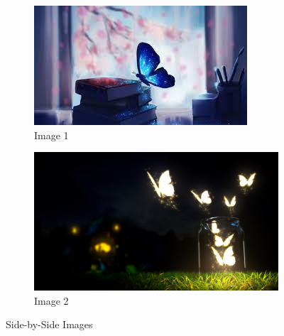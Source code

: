 \documentclass{article}
\begin{document}
	\begin{figure}[h]
		\centering
		\begin{subfigure}[b]
			{0.45\textwidth}
			\centering
			\includegraphics[width=\linewidth]{click.jpg}
			\caption{Image 1}
			\label{fig:image 1}
			
			
		\end{subfigure}
		\hfill
		\begin{subfigure}[b]
			{0.45\textwidth}
			\centering
			\includegraphics[width=\linewidth]{b.jpg}
			\caption{Image 2}
			\label{fig:image 2}
		\end{subfigure}
		\caption{Side-by-Side Images}
		\label{fig:sidebyside}
	\end{figure}
\end{document}
